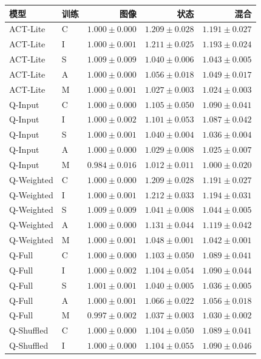 \documentclass[11pt,a4paper,fontset=fandol]{ctexart}
\begin{document}
\begin{center}
\footnotesize
\begin{tabular}{llrrr}
\toprule
模型 & 训练 & 图像 & 状态 & 混合 \\
\midrule
ACT-Lite & C & $1.000\pm0.000$ & $1.209\pm0.028$ & $1.191\pm0.027$ \\
ACT-Lite & I & $1.000\pm0.001$ & $1.211\pm0.025$ & $1.193\pm0.024$ \\
ACT-Lite & S & $1.009\pm0.009$ & $1.040\pm0.006$ & $1.043\pm0.005$ \\
ACT-Lite & A & $1.000\pm0.000$ & $1.056\pm0.018$ & $1.049\pm0.017$ \\
ACT-Lite & M & $1.000\pm0.001$ & $1.027\pm0.003$ & $1.024\pm0.003$ \\
Q-Input & C & $1.000\pm0.000$ & $1.105\pm0.050$ & $1.090\pm0.041$ \\
Q-Input & I & $1.000\pm0.002$ & $1.101\pm0.053$ & $1.087\pm0.042$ \\
Q-Input & S & $1.000\pm0.001$ & $1.040\pm0.004$ & $1.036\pm0.004$ \\
Q-Input & A & $1.000\pm0.000$ & $1.029\pm0.008$ & $1.025\pm0.007$ \\
Q-Input & M & $0.984\pm0.016$ & $1.012\pm0.011$ & $1.000\pm0.020$ \\
Q-Weighted & C & $1.000\pm0.000$ & $1.209\pm0.028$ & $1.191\pm0.027$ \\
Q-Weighted & I & $1.000\pm0.001$ & $1.212\pm0.033$ & $1.194\pm0.031$ \\
Q-Weighted & S & $1.009\pm0.009$ & $1.041\pm0.008$ & $1.044\pm0.005$ \\
Q-Weighted & A & $1.000\pm0.000$ & $1.131\pm0.044$ & $1.119\pm0.042$ \\
Q-Weighted & M & $1.000\pm0.001$ & $1.048\pm0.001$ & $1.042\pm0.001$ \\
Q-Full & C & $1.000\pm0.000$ & $1.103\pm0.050$ & $1.089\pm0.041$ \\
Q-Full & I & $1.000\pm0.002$ & $1.104\pm0.054$ & $1.090\pm0.044$ \\
Q-Full & S & $1.001\pm0.001$ & $1.040\pm0.005$ & $1.036\pm0.005$ \\
Q-Full & A & $1.000\pm0.001$ & $1.066\pm0.022$ & $1.056\pm0.018$ \\
Q-Full & M & $0.997\pm0.002$ & $1.037\pm0.003$ & $1.030\pm0.002$ \\
Q-Shuffled & C & $1.000\pm0.000$ & $1.104\pm0.050$ & $1.089\pm0.041$ \\
Q-Shuffled & I & $1.000\pm0.000$ & $1.104\pm0.055$ & $1.090\pm0.046$ \\

\end{tabular}
\end{center}
\end{document}
